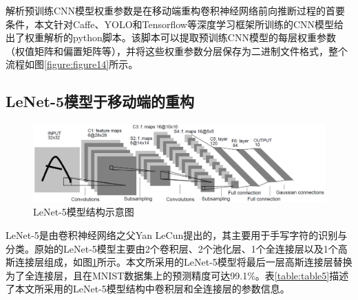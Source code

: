 解析预训练CNN模型权重参数是在移动端重构卷积神经网络前向推断过程的首要条件，本文针对Caffe、YOLO和Tensorflow等深度学习框架所训练的CNN模型给出了权重解析的python脚本。该脚本可以提取预训练CNN模型的每层权重参数（权值矩阵和偏置矩阵等），并将这些权重参数分层保存为二进制文件格式，整个流程如图\ref{figure:figure14}所示。

\subsection{LeNet-5模型于移动端的重构}

\begin{figure}[htbp]
    \centering
    \includegraphics[width=1.0\textwidth]{figures/lenet.pdf}
    \caption{LeNet-5模型结构示意图 \cite{lecun1998gradient}}\label{figure:figure15}
\end{figure}

LeNet-5是由卷积神经网络之父Yan LeCun提出的，其主要用于手写字符的识别与分类。原始的LeNet-5模型主要由2个卷积层、2个池化层、1个全连接层以及1个高斯连接层组成，如图\ref{figure:figure15}所示。本文所采用的LeNet-5模型将最后一层高斯连接层替换为了全连接层，且在MNIST数据集\cite{lecun.com}上的预测精度可达99.1\%。表\ref{table:table5}描述了本文所采用的LeNet-5模型结构中卷积层和全连接层的参数信息。

\vspace{-1.5em}
\begin{table}[htbp]
  \centering
  \caption{LeNet-5模型结构中的卷积层和全连接层}
  \label{table:table5}
\end{table}
\vspace{-0.5em}

